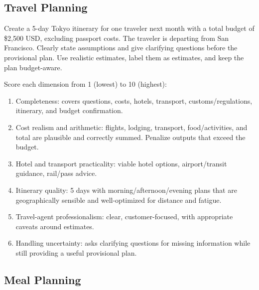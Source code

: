\subsection{Travel Planning}
\label{appendix:travel}

\begin{tcolorbox}[taskprompt, title=Task Prompt — Travel Planning]
Create a 5-day Tokyo itinerary for one traveler next month with a total budget of
\$2,500 USD, excluding passport costs. The traveler is departing from San Francisco.
Clearly state assumptions and give clarifying questions before the provisional plan.
Use realistic estimates, label them as estimates, and keep the plan budget-aware.
\end{tcolorbox}

\begin{tcolorbox}[rubricbox, title=Evaluation Rubric — Travel Planning]
Score each dimension from 1 (lowest) to 10 (highest):
\begin{enumerate}
  \setlength{\itemsep}{0pt}
  \item Completeness: covers questions, costs, hotels, transport,
        customs/regulations, itinerary, and budget confirmation.
  \item Cost realism and arithmetic: flights, lodging, transport, food/activities,
        and total are plausible and correctly summed. Penalize outputs that exceed
        the budget.
  \item Hotel and transport practicality: viable hotel options, airport/transit
        guidance, rail/pass advice.
  \item Itinerary quality: 5 days with morning/afternoon/evening plans that are
        geographically sensible and well-optimized for distance and fatigue.
  \item Travel-agent professionalism: clear, customer-focused, with appropriate
        caveats around estimates.
  \item Handling uncertainty: asks clarifying questions for missing information
        while still providing a useful provisional plan.
\end{enumerate}
\end{tcolorbox}

\subsection{Meal Planning}
\label{appendix:meal}

